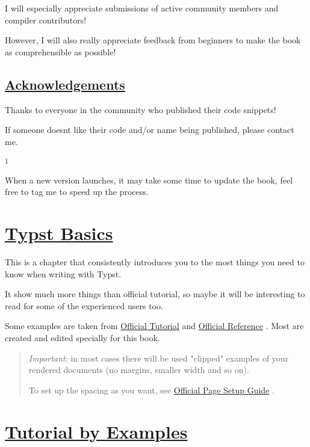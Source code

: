I will especially appreciate submissions of active community members and
compiler contributors!

However, I will also really appreciate feedback from beginners to make
the book as comprehensible as possible!

\subsection{\texorpdfstring{\hyperref[acknowledgements]{Acknowledgements}}{Acknowledgements}}\label{acknowledgements}

Thanks to everyone in the community who published their code snippets!

If someone doesn\textquotesingle t like their code and/or name being
published, please contact me.

\label{1}
\textsuperscript{1}

When a new version launches, it may take some time to update the book,
feel free to tag me to speed up the process.

\section{\texorpdfstring{\hyperref[typst-basics]{Typst
Basics}}{Typst Basics}}\label{typst-basics}

This is a chapter that consistently introduces you to the most things
you need to know when writing with Typst.

It show much more things than official tutorial, so maybe it will be
interesting to read for some of the experienced users too.

Some examples are taken from
\href{https://typst.app/docs/tutorial/}{Official Tutorial} and
\href{https://typst.app/docs/reference/}{Official Reference} . Most are
created and edited specially for this book.

\begin{quote}
\emph{Important:} in most cases there will be used "clipped" examples of
your rendered documents (no margins, smaller width and so on).

To set up the spacing as you want, see
\href{https://typst.app/docs/guides/page-setup-guide/}{Official Page
Setup Guide} .
\end{quote}

\section{\texorpdfstring{\hyperref[tutorial-by-examples]{Tutorial by
Examples}}{Tutorial by Examples}}\label{tutorial-by-examples}


